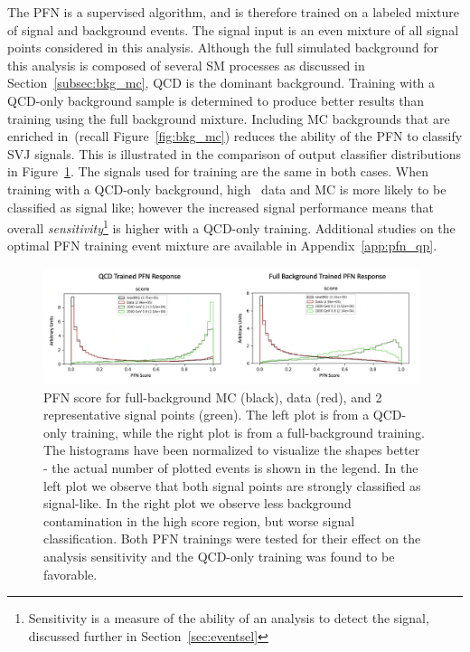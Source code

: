 The PFN is a supervised algorithm, and is therefore trained on a labeled mixture of signal and background events. The signal input is an even mixture of all signal points considered in this analysis. Although the full simulated background for this analysis is composed of several SM processes as discussed in Section~\ref{subsec:bkg_mc}, QCD is the dominant background. Training with a QCD-only background sample is determined to produce better results than training using the full background mixture. Including MC backgrounds that are enriched in~\met (recall Figure~\ref{fig:bkg_mc}) reduces the ability of the PFN to classify SVJ signals. This is illustrated in the comparison of output classifier distributions in Figure~\ref{fig:pfn_MC_training_mixture}. The signals used for training are the same in both cases. When training with a QCD-only background, high \met~data and MC is more likely to be classified as signal like; however the increased signal performance means that overall \textit{sensitivity}\footnote{Sensitivity is a measure of the ability of an analysis to detect the signal, discussed further in Section~\ref{sec:eventsel}} is higher with a QCD-only training. Additional studies on the optimal PFN training event mixture are available in Appendix~\ref{app:pfn_qp}. \par

\begin{figure}[!htbp]
\centering
   \includegraphics[width=0.98\textwidth]{figures/ml/pfn_MC_training_mixture}
    \caption{PFN score for full-background MC (black), data (red), and 2 representative signal points (green). The left plot is from a QCD-only training, while the right plot is from a full-background training. The histograms have been normalized to visualize the shapes better - the actual number of plotted events is shown in the legend. In the left plot we observe that both signal points are strongly classified as signal-like. In the right plot we observe less background contamination in the high score region, but worse signal classification. Both PFN trainings were tested for their effect on the analysis sensitivity and the QCD-only training was found to be favorable. 
    \label{fig:pfn_MC_training_mixture}}
\end{figure}

